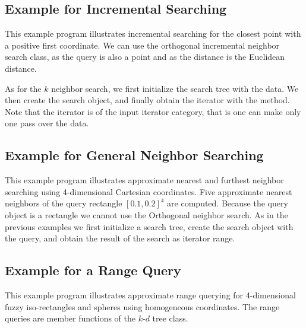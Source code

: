 
\newpage
\subsection{Example for Incremental Searching}

This example program illustrates incremental searching for the closest
point with a positive first coordinate. We can use the orthogonal
incremental neighbor search class, as the query is also a point and as
the distance is the Euclidean distance. 

As for the $k$ neighbor search, we first initialize the search tree with
the data. We then create the search object, and finally obtain the iterator
with the  method. Note that the iterator is of the input
iterator category, that is one can make only one pass over the data. 

 


\newpage
\subsection{Example for General Neighbor Searching}

This example program illustrates approximate nearest and furthest
neighbor searching using 4-dimensional Cartesian coordinates.  Five
approximate nearest neighbors of the query rectangle
$[0.1,0.2]^4$ are computed. Because the query object is a rectangle
we cannot use the Orthogonal neighbor search. As in the previous 
examples we first initialize a search tree, create the search object
with the query, and obtain the result of the search as iterator range.
 

\newpage
\subsection{Example for a Range Query}

This example program illustrates approximate range querying for
4-dimensional fuzzy iso-rectangles and spheres using homogeneous
coordinates. The range queries are member functions of the $k$-$d$ 
tree class.




